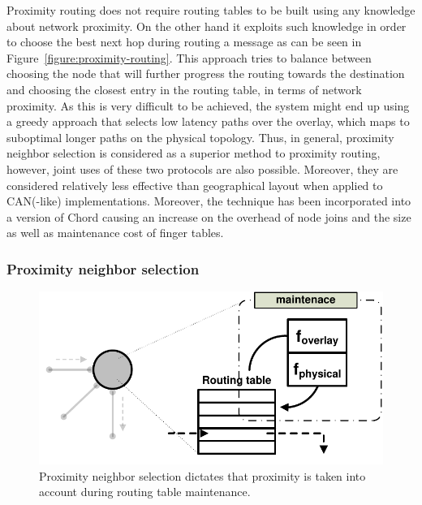 Proximity routing does not require routing tables to be built using any
knowledge about network proximity. On the other hand it exploits such knowledge
in order to choose the best next hop during routing a message as can be seen in
Figure~\ref{figure:proximity-routing}. This approach tries to balance between
choosing the node that will further progress the routing towards the destination
and choosing the closest entry in the routing table, in terms of network
proximity. As this is very difficult to be achieved, the system might end up
using a greedy approach that selects low latency paths over the overlay, which
maps to suboptimal longer paths on the physical topology. Thus, in general,
proximity neighbor selection is considered as a superior method to proximity
routing, however, joint uses of these two protocols are also possible. Moreover,
they are considered relatively less effective than geographical layout when
applied to CAN(-like) implementations. Moreover, the technique has been
incorporated into a version of Chord causing an increase on the overhead of node
joins and the size as well as maintenance cost of finger tables.

%
%

\subsubsection{Proximity neighbor selection}

\begin{figure}[ht]
\centering
  \includegraphics[scale=0.4]{img/pdf/proximity-neighbor-selection.pdf}
\caption{Proximity neighbor selection dictates that proximity is taken into
account during routing table maintenance.}
\label{figure:proximity-neighbour-selection}
\end{figure}

